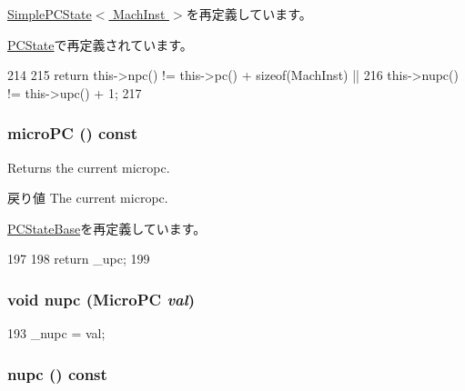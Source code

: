 \hyperlink{classGenericISA_1_1SimplePCState_ae3f0eb15a9382eefff6b00cf7999c2e3}{SimplePCState$<$ MachInst $>$}を再定義しています。

\hyperlink{classX86ISA_1_1PCState_ae3f0eb15a9382eefff6b00cf7999c2e3}{PCState}で再定義されています。


\begin{DoxyCode}
214     {
215         return this->npc() != this->pc() + sizeof(MachInst) ||
216                this->nupc() != this->upc() + 1;
217     }
\end{DoxyCode}
\hypertarget{classGenericISA_1_1UPCState_a8f0ea0df7a63b5fbf898277c4d3a1268}{
\subsubsection[{microPC}]{ microPC () const}}
\label{classGenericISA_1_1UPCState_a8f0ea0df7a63b5fbf898277c4d3a1268}
Returns the current micropc.

\begin{DoxyReturn}{戻り値}
The current micropc. 
\end{DoxyReturn}


\hyperlink{classGenericISA_1_1PCStateBase_a8f0ea0df7a63b5fbf898277c4d3a1268}{PCStateBase}を再定義しています。


\begin{DoxyCode}
197     {
198         return _upc;
199     }
\end{DoxyCode}
\hypertarget{classGenericISA_1_1UPCState_a58db0b2a7462cf953ace57aee78ac338}{
\subsubsection[{nupc}]{\setlength{\rightskip}{0pt plus 5cm}void nupc ({\bf MicroPC} {\em val})}}
\label{classGenericISA_1_1UPCState_a58db0b2a7462cf953ace57aee78ac338}



\begin{DoxyCode}
193 { _nupc = val; }
\end{DoxyCode}
\hypertarget{classGenericISA_1_1UPCState_abc005b6462dcd78d9b0cfd3f0cfe3913}{
\subsubsection[{nupc}]{ nupc () const}}
\label{classGenericISA_1_1UPCState_abc005b6462dcd78d9b0cfd3f0cfe3913}




